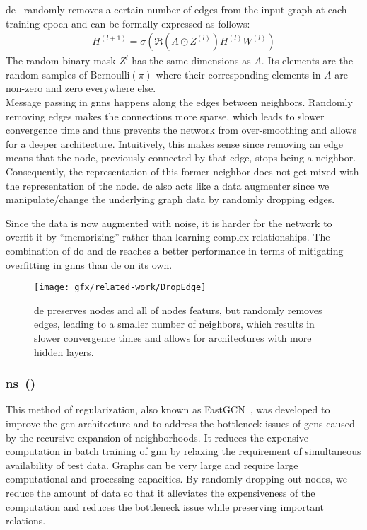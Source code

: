 \ac{de}~\cite{Rong2020} randomly removes a certain number of edges from the input graph at each training epoch and can be formally expressed as follows:
\begin{align*}
    H^{(l+1)} = \sigma(\mathfrak{R}(A \odot Z^{(l)}) H^{(l)} W^{(l)})
\end{align*}
The random binary mask $Z^{l}$ has the same dimensions as $A$.
Its elements are the random samples of Bernoulli$(\pi)$ where their
corresponding elements in $A$ are non-zero and zero everywhere else. \\
Message passing in \acp{gnn} happens along the edges between neighbors.
Randomly removing edges makes the connections more sparse, which leads to slower convergence time and thus prevents the
network from over-smoothing and allows for a deeper architecture.
Intuitively, this makes sense since removing an edge means that the node, previously connected by that edge, stops being a neighbor. Consequently, the representation of this former neighbor does not get mixed with the representation of the node.
\Ac{de} also acts like a data augmenter since we manipulate/change the underlying graph data by randomly dropping edges.

Since the data is now augmented with noise, it is harder for the network to overfit it by ``memorizing'' rather than learning complex relationships.
The combination of \ac{do} and \ac{de} reaches a better performance in terms of mitigating overfitting in \acp{gnn} than \ac{de} on its own.

\begin{figure}[ht]
    \centering
    \texttt{[image: gfx/related-work/DropEdge]}
    \caption{\acf{de} preserves nodes and all of nodes featurs, but randomly removes
        edges, leading to a smaller number of neighbors, which results in slower convergence times and allows for architectures with more hidden layers.}\label{fig:related:DropEdge}
\end{figure}

\subsubsection{\acl*{ns}~(\citeauthor{Chen2018})}
\label{sec:related:pred:regularization:ns}
This method of regularization, also known as FastGCN~\cite{Chen2018}, was developed to improve the \ac{gcn} \cite{Kipf2017} architecture and to address the bottleneck issues of \acp{gcn} caused by the recursive expansion of neighborhoods.
It reduces the expensive computation in batch training of \ac{gnn} by relaxing the requirement of simultaneous availability of test data.
Graphs can be very large and require large computational and processing capacities.
By randomly dropping out nodes, we reduce the amount of data so that it alleviates the expensiveness of the computation and reduces the bottleneck issue while preserving important relations.

